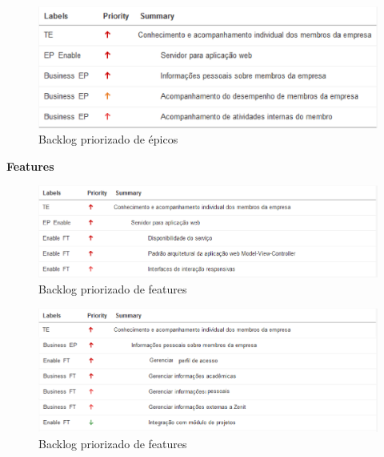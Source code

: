 \begin{figure}[H]
    \centering
    \includegraphics[keepaspectratio=true,scale=0.6]{figuras/blep01.eps}
    \caption[Backlog épicos]{Backlog priorizado de épicos\label{blep01}}
\end{figure}

\textbf{Features}

\begin{figure}[H]
    \centering
    \includegraphics[keepaspectratio=true,scale=0.6]{figuras/blft01.eps}
    \caption[Backlog features]{Backlog priorizado de features\label{blft01}}
\end{figure}

\begin{figure}[H]
    \centering
    \includegraphics[keepaspectratio=true,scale=0.6]{figuras/blft02.eps}
    \caption[Backlog features]{Backlog priorizado de features\label{blft02}}
\end{figure}


